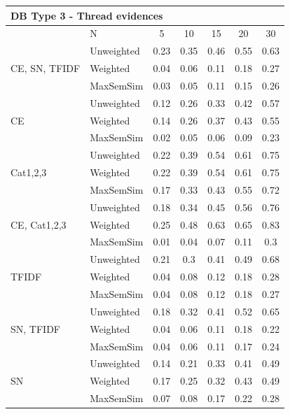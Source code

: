 \documentclass[conference]{IEEEtran}
\begin{document}
\begin{table}[!h]
\begin{tabular}{l||l|ccccc}
		\multicolumn{7}{l}{DB Type 3 - Thread evidences}\\\hline\hline
		& N & 5 & 10 & 15 & 20 & 30\\\hline
		\hline
		
		\multirow{3}{*}{CE, SN, TFIDF} & Unweighted & 0.23 & 0.35 & 0.46 & 0.55 & 0.63\\
		 & Weighted & 0.04 & 0.06 & 0.11 & 0.18 & 0.27\\
		 & MaxSemSim & 0.03 & 0.05 & 0.11 & 0.15 & 0.26\\ 
		\hline
		
		\multirow{3}{*}{CE} & Unweighted & 0.12 & 0.26 & 0.33 & 0.42 & 0.57\\
		 & Weighted & 0.14 & 0.26 & 0.37 & 0.43 & 0.55\\
		 & MaxSemSim & 0.02 & 0.05 & 0.06 & 0.09 & 0.23\\ 
		\hline
		
		\multirow{3}{*}{Cat1,2,3} & Unweighted & 0.22 & 0.39 & 0.54 & 0.61 & 0.75\\
		 & Weighted & 0.22 & 0.39 & 0.54 & 0.61 & 0.75\\
		 & MaxSemSim & 0.17 & 0.33 & 0.43 & 0.55 & 0.72\\ 
		\hline
		
		\multirow{3}{*}{CE, Cat1,2,3} & Unweighted & 0.18 & 0.34 & 0.45 & 0.56 & 0.76\\
		 & Weighted & 0.25 & 0.48 & 0.63 & 0.65 & 0.83\\
		 & MaxSemSim & 0.01 & 0.04 & 0.07 & 0.11 & 0.3\\ 
		\hline
		
		\multirow{3}{*}{TFIDF} & Unweighted & 0.21 & 0.3 & 0.41 & 0.49 & 0.68\\
		 & Weighted & 0.04 & 0.08 & 0.12 & 0.18 & 0.28\\
		 & MaxSemSim & 0.04 & 0.08 & 0.12 & 0.18 & 0.27\\ 
		\hline
		
		\multirow{3}{*}{SN, TFIDF} & Unweighted & 0.18 & 0.32 & 0.41 & 0.52 & 0.65\\
		 & Weighted & 0.04 & 0.06 & 0.11 & 0.18 & 0.22\\
		 & MaxSemSim & 0.04 & 0.06 & 0.11 & 0.17 & 0.24\\ 
		\hline
		
		\multirow{3}{*}{SN} & Unweighted & 0.14 & 0.21 & 0.33 & 0.41 & 0.49\\
		 & Weighted & 0.17 & 0.25 & 0.32 & 0.43 & 0.49\\
		 & MaxSemSim & 0.07 & 0.08 & 0.17 & 0.22 & 0.28\\ 
		\hline				
	\end{tabular}
\end{table}
	
\end{document}
